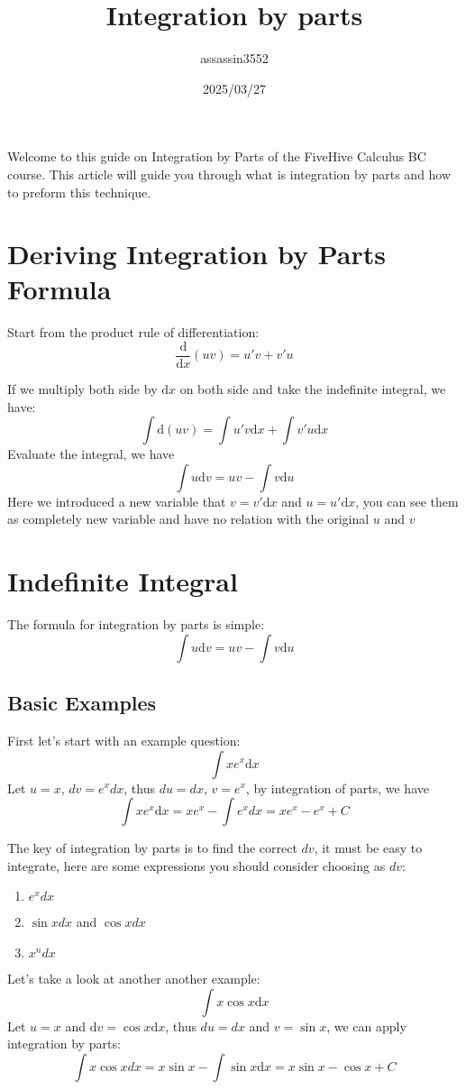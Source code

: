 \documentclass{article}
\title{Integration by parts}
\author{assassin3552}
\date{2025/03/27}
\numberwithin{equation}{section}
\begin{document}
\maketitle
Welcome to this guide on Integration by Parts of the FiveHive Calculus BC course. This article will guide you through what is integration by parts and how to preform this technique.
\section{Deriving Integration by Parts Formula}
Start from the product rule of differentiation:
\[
\frac{\mathrm{d}}{\mathrm{d}x} (uv) = u'v + v'u
\]

If we multiply both side by $\mathrm{d}x$ on both side and take the indefinite integral, we have:
\[
\int \mathrm{d}(uv) = \int u'v \mathrm{d}x + \int v'u \mathrm{d}x
\]
Evaluate the integral, we have 
\[
\int u \mathrm{d}v = uv - \int v\mathrm{d}u
\]
Here we introduced a new variable that $v = v'\mathrm{d}x$ and $u = u'\mathrm{d}x$, you can see them as completely new variable and have no relation with the original $u$ and $v$

\newpage
\section{Indefinite Integral}
The formula for integration by parts is simple:
\[
\int u \mathrm{d}v = uv - \int v \mathrm{d}u
\]

\subsection{Basic Examples}
First let's start with an example question:
\[
\int x e^x \mathrm{d}x
\]
Let $u=x$, $dv = e^x dx$, thus $du = dx$, $v = e^x$, by integration of parts, we have 
\[
\int x e^x \mathrm{d}x = xe^x - \int e^x dx = xe^x - e^x +C
\]

The key of integration by parts is to find the correct $dv$, it must be easy to integrate, here are some expressions you should consider choosing as $dv$:
\begin{enumerate}
    \item $e^x dx$
    \item $\sin x dx$ and $\cos x dx$
    \item $x^n dx$
\end{enumerate}

Let's take a look at another another example:
\[
\int x\cos x \mathrm{d}x
\]
Let $u = x$ and $\mathrm{d}v = \cos x \mathrm{d}x$, thus $du = dx$ and $v = \sin x$, we can apply integration by parts:
\[
\int x \cos x dx = x\sin x - \int \sin x \mathrm{d}x = x \sin x - \cos x + C
\]
\end{document}
